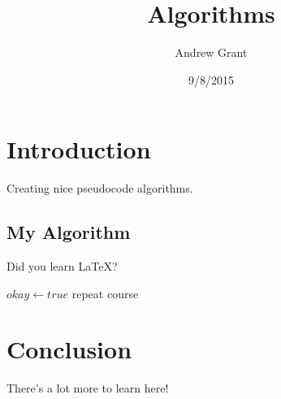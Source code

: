 \documentclass{article}
\title{Algorithms}
\author{Andrew Grant}
\date{9/8/2015}
\begin{document}
\maketitle

\section{Introduction}

Creating nice pseudocode algorithms.

\subsection{My Algorithm}

Did you learn \LaTeX?

\begin{algorithmic}
	\State $okay \gets true$
\Else
		\State repeat course
	\EndWhile
\EndIf
\end{algorithmic}

\section{Conclusion}

There's a lot more to learn here!
\end{document}
